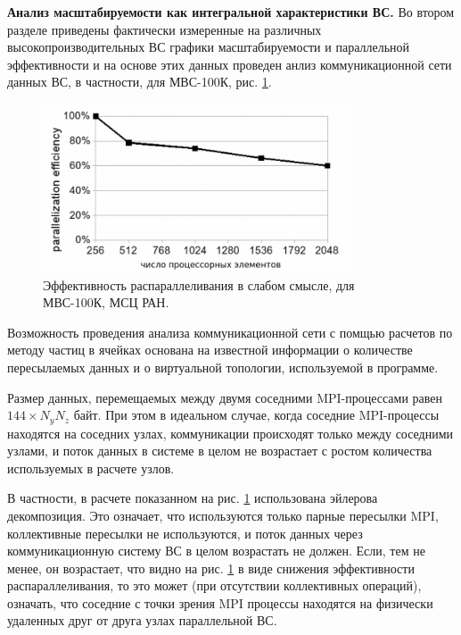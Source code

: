 \textbf{Анализ масштабируемости как интегральной характеристики ВС.}
Во втором разделе приведены фактически измеренные на различных высокопроизводительных ВС графики масштабируемости и параллельной эффективности и на основе этих данных проведен анлиз коммуникационной сети данных ВС, в частности, для МВС-100К, рис. \ref{eff2}. 

\begin{figure}[h]
	\begin{center}
		\includegraphics[height=5cm,keepaspectratio]{images/eff_weak_JSCC.png}
		\caption{
			Эффективность распараллеливания в слабом смысле, для МВС-100К, МСЦ РАН.
		}
		\label{eff2}
	\end{center} 
\end{figure}

Возможность проведения анализа коммуникационной сети с помщью расчетов по методу частиц в ячейках основана на известной информации о количестве пересылаемых данных и о виртуальной топологии, используемой в программе.

Размер данных, перемещаемых между двумя соседними MPI-процессами равен $144 \times N_y N_z  $ байт. При этом в идеальном случае, когда соседние MPI-процессы находятся на соседних узлах, коммуникации происходят только между соседними узлами, и поток данных в системе в целом не возрастает с ростом количества используемых в расчете узлов.

В частности, в расчете показанном на рис. \ref{eff2} использована эйлерова декомпозиция. Это означает, что используются только парные пересылки MPI, коллективные пересылки не используются, и поток данных через коммуникационную систему ВС в целом возрастать не должен. Если, тем не менее, он возрастает, что видно на рис. \ref{eff2} в виде снижения эффективности распараллеливания, то это может (при отсутствии коллективных операций), означать, что соседние с точки зрения MPI процессы находятся на физически удаленных друг от друга узлах параллельной ВС.

